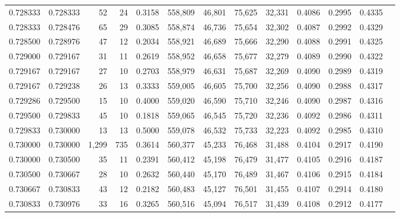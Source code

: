 \begin{tabular}{rrrrrrrrrrrrr}
0.728333 & 0.728333 &    52 &  24 &                                     0.3158 & 558,809 &  46,801 &  75,625 &  32,331 & 0.4086 & 0.2995 & 0.4335 \\
0.728333 & 0.728476 &    65 &  29 &                                     0.3085 & 558,874 &  46,736 &  75,654 &  32,302 & 0.4087 & 0.2992 & 0.4329 \\
0.728500 & 0.728976 &    47 &  12 &                                     0.2034 & 558,921 &  46,689 &  75,666 &  32,290 & 0.4088 & 0.2991 & 0.4325 \\
0.729000 & 0.729167 &    31 &  11 &                                     0.2619 & 558,952 &  46,658 &  75,677 &  32,279 & 0.4089 & 0.2990 & 0.4322 \\
0.729167 & 0.729167 &    27 &  10 &                                     0.2703 & 558,979 &  46,631 &  75,687 &  32,269 & 0.4090 & 0.2989 & 0.4319 \\
0.729167 & 0.729238 &    26 &  13 &                                     0.3333 & 559,005 &  46,605 &  75,700 &  32,256 & 0.4090 & 0.2988 & 0.4317 \\
0.729286 & 0.729500 &    15 &  10 &                                     0.4000 & 559,020 &  46,590 &  75,710 &  32,246 & 0.4090 & 0.2987 & 0.4316 \\
0.729500 & 0.729833 &    45 &  10 &                                     0.1818 & 559,065 &  46,545 &  75,720 &  32,236 & 0.4092 & 0.2986 & 0.4311 \\
0.729833 & 0.730000 &    13 &  13 &                                     0.5000 & 559,078 &  46,532 &  75,733 &  32,223 & 0.4092 & 0.2985 & 0.4310 \\
0.730000 & 0.730000 & 1,299 & 735 &                                     0.3614 & 560,377 &  45,233 &  76,468 &  31,488 & 0.4104 & 0.2917 & 0.4190 \\
0.730000 & 0.730500 &    35 &  11 &                                     0.2391 & 560,412 &  45,198 &  76,479 &  31,477 & 0.4105 & 0.2916 & 0.4187 \\
0.730500 & 0.730667 &    28 &  10 &                                     0.2632 & 560,440 &  45,170 &  76,489 &  31,467 & 0.4106 & 0.2915 & 0.4184 \\
0.730667 & 0.730833 &    43 &  12 &                                     0.2182 & 560,483 &  45,127 &  76,501 &  31,455 & 0.4107 & 0.2914 & 0.4180 \\
0.730833 & 0.730976 &    33 &  16 &                                     0.3265 & 560,516 &  45,094 &  76,517 &  31,439 & 0.4108 & 0.2912 & 0.4177 \\

\end{tabular}
